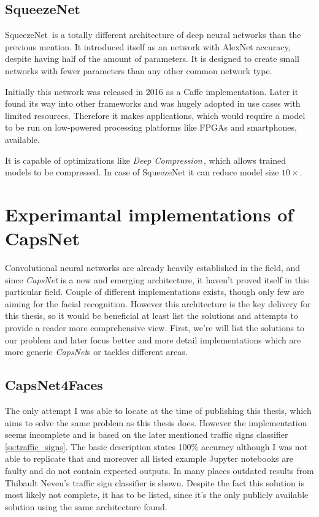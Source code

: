 \subsection{SqueezeNet}

SqueezeNet\,\cite{squeezenet} is a totally different architecture of deep neural networks than the previous mention. It introduced itself as an network with AlexNet accuracy, despite having half of the amount of parameters. It is designed to create small networks with fewer parameters than any other common network type.

Initially this network was released in 2016 as a Caffe implementation. Later it found its way into other frameworks and was hugely adopted in use cases with limited resources. Therefore it makes applications, which would require a model to be run on low-powered processing platforms like FPGAs and smartphones, available.

It is capable of optimizations like \textit{Deep Compression}\,\cite{compression}, which allows trained models to be compressed. In case of SqueezeNet it can reduce model size $10\times$.

\section{Experimantal implementations of CapsNet}

Convolutional neural networks are already heavily established in the field, and since \textit{CapsNet} is a new and emerging architecture, it haven't proved itself in this particular field. Couple of different implementations exists, though only few are aiming for the facial recognition. However this architecture is the key delivery for this thesis, so it would be beneficial at least list the solutions and attempts to provide a reader more comprehensive view. First, we're will list the solutions to our problem and later focus better and more detail implementations which are more generic \textit{CapsNet}s or tackles different areas.

\subsection{CapsNet4Faces}

The only attempt I was able to locate at the time of publishing this thesis, which aims to solve the same problem as this thesis does. However the implementation\,\cite{capsnet4faces} seems incomplete and is based on the later mentioned traffic signs classifier\,\ref{ss:traffic_signs}. The basic description states 100\% accuracy although I was not able to replicate that and moreover all listed example Jupyter notebooks are faulty and do not contain expected outputs. In many places outdated results from Thibault Neveu's traffic sign classifier is shown. Despite the fact this solution is most likely not complete, it has to be listed, since it's the only publicly available solution using the same architecture found.


